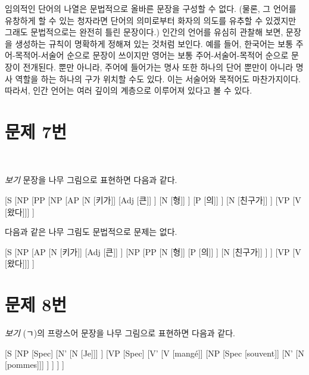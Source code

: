 \documentclass{article}
\begin{document}
        임의적인 단어의 나열은 문법적으로 올바른 문장을 구성할 수 없다. (물론, 그 언어를 유창하게 할 수 있는 청자라면 단어의 의미로부터 화자의 의도를 유추할 수 있겠지만 그래도 문법적으로는 완전히 틀린 문장이다.) 인간의 언어를 유심히 관찰해 보면, 문장을 생성하는 규칙이 명확하게 정해져 있는 것처럼 보인다. 예를 들어, 한국어는 보통 주어-목적어-서술어 순으로 문장이 쓰이지만 영어는 보통 주어-서술어-목적어 순으로 문장이 전개된다. 뿐만 아니라, 주어에 들어가는 명사 또한 하나의 단어 뿐만이 아니라 명사 역할을 하는 하나의 구가 위치할 수도 있다. 이는 서술어와 목적어도 마찬가지이다. 따라서, 인간 언어는 여러 깊이의 계층으로 이루어져 있다고 볼 수 있다.
    
    \section{문제 7번}\
    
        \emph{보기} 문장을 나무 그림으로 표현하면 다음과 같다.
        
        [S
            [NP
                [PP
                    [NP
                        [AP
                            [N [키가]]
                            [Adj [큰]]
                        ]
                        [N [형]]
                    ]
                    [P [의]]
                ]
                [N [친구가]]
            ]
            [VP [V [왔다]]]
        ]
        
        다음과 같은 나무 그림도 문법적으로 문제는 없다.
        
        [S
            [NP
                [AP
                    [N [키가]]
                    [Adj [큰]]
                ]
                [NP
                    [PP
                        [N [형]]
                        [P [의]]
                    ]
                    [N [친구가]]
                ]
            ]
            [VP [V [왔다]]]
        ]

    \section{문제 8번}
    
        \emph{보기} (ㄱ)의 프랑스어 문장을 나무 그림으로 표현하면 다음과 같다.
        
        [S
            [NP
                [Spec]
                [N' [N [Je]]]
            ]
            [VP
                [Spec]
                [V'
                    [V [mang\'{e}]]
                    [NP
                        [Spec [souvent]]
                        [N' [N [pommes]]]
                    ]
                ]
            ]
        ]
        
\end{document}
